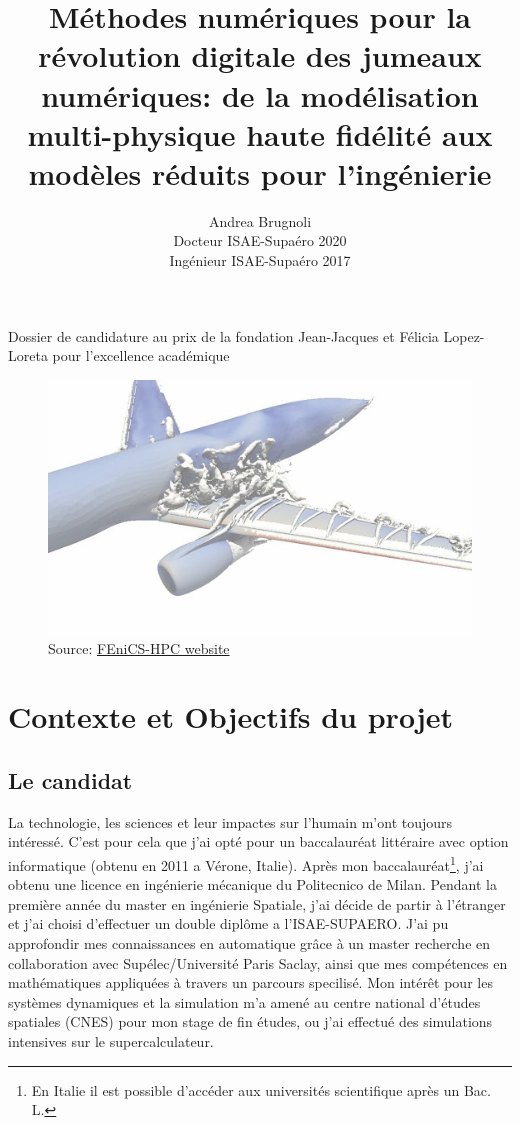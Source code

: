 \documentclass[french]{article}
\author{Andrea Brugnoli \\ 
\hspace{2.8pt} Docteur ISAE-Supaéro 2020\\
Ingénieur ISAE-Supaéro 2017}
\title{Méthodes numériques pour la révolution digitale des jumeaux numériques: de la modélisation multi-physique haute fidélité aux modèles réduits pour l'ingénierie}
\date{}
\begin{document}
\maketitle

\large{Dossier de candidature au prix de la fondation Jean-Jacques et Félicia
	Lopez-Loreta pour l’excellence académique}


\begin{figure}[h]
	\centering
	\includegraphics[width=.95\textwidth]{3Dplane.jpg}
	\captionsetup{labelformat=empty}
	\caption{Source: \href{http://www.fenics-hpc.org/}{FEniCS-HPC website}}
\end{figure}





\thispagestyle{empty}

\newpage

\section{Contexte et Objectifs du projet}

\subsection{Le candidat}
La technologie,  les sciences et leur impactes sur l'humain m'ont toujours intéressé. C'est pour cela que j'ai opté pour un baccalauréat littéraire avec option informatique (obtenu en 2011 a Vérone, Italie). Après mon baccalauréat\footnote{En Italie il est possible d'accéder aux universités scientifique après un Bac. L.}, j'ai obtenu une licence en ingénierie mécanique du Politecnico de Milan. Pendant la première année du master en ingénierie Spatiale, j'ai décide de partir \`a l'étranger et j'ai choisi d'effectuer un double diplôme a l'ISAE-SUPAERO. J'ai pu approfondir mes connaissances en automatique grâce \`a un master recherche en collaboration avec Supélec/Université Paris Saclay, ainsi que mes compétences en mathématiques appliquées \`a travers un parcours specilis\'e. Mon intérêt pour les systèmes dynamiques et la simulation m'a amené au centre national d'études spatiales (CNES) pour mon stage de fin études, ou j'ai effectué des simulations intensives sur le supercalculateur. \\
\end{document}
